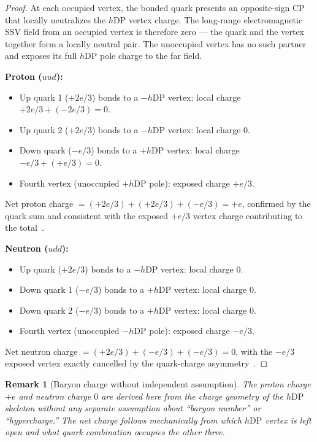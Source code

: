 \documentclass[12pt]{article}
\newtheorem{remark}[theorem]{Remark}
\newcommand{\hDP}{h\mathrm{DP}}
\begin{document}
\begin{proof}
At each occupied vertex, the bonded quark presents an opposite-sign
CP that locally neutralizes the $\hDP$ vertex charge.  The
long-range electromagnetic SSV field from an occupied vertex is
therefore zero --- the quark and the vertex together form a locally
neutral pair.  The unoccupied vertex has no such partner and exposes
its full $\hDP$ pole charge to the far field.

\textbf{Proton ($uud$):}
\begin{itemize}[noitemsep]
\item Up quark 1 ($+2e/3$) bonds to a $-\hDP$ vertex: local charge
  $+2e/3 + (-2e/3) = 0$.
\item Up quark 2 ($+2e/3$) bonds to a $-\hDP$ vertex: local charge $0$.
\item Down quark ($-e/3$) bonds to a $+\hDP$ vertex: local charge
  $-e/3 + (+e/3) = 0$.
\item Fourth vertex (unoccupied $+\hDP$ pole): exposed charge $+e/3$.
\end{itemize}
Net proton charge $= (+2e/3) + (+2e/3) + (-e/3) = +e$, confirmed by
the quark sum and consistent with the exposed $+e/3$ vertex charge
contributing to the total~\cite{pdg2022}.

\textbf{Neutron ($udd$):}
\begin{itemize}[noitemsep]
\item Up quark ($+2e/3$) bonds to a $-\hDP$ vertex: local charge $0$.
\item Down quark 1 ($-e/3$) bonds to a $+\hDP$ vertex: local charge $0$.
\item Down quark 2 ($-e/3$) bonds to a $+\hDP$ vertex: local charge $0$.
\item Fourth vertex (unoccupied $-\hDP$ pole): exposed charge $-e/3$.
\end{itemize}
Net neutron charge $= (+2e/3) + (-e/3) + (-e/3) = 0$, with the
$-e/3$ exposed vertex exactly cancelled by the quark-charge
asymmetry~\cite{pdg2022}.
\end{proof}

\begin{remark}[Baryon charge without independent assumption]
The proton charge $+e$ and neutron charge $0$ are derived here from
the charge geometry of the $\hDP$ skeleton without any separate
assumption about ``baryon number'' or ``hypercharge.''  The net
charge follows mechanically from which $\hDP$ vertex is left open
and what quark combination occupies the other three.
\end{remark}
\end{document}
